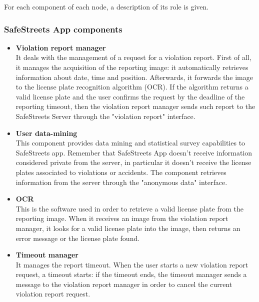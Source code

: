 \documentclass{article}
\begin{document}
		\clearpage
		For each component of each node, a description of its role is given.
		
		\subsubsection{SafeStreets App components}
		\begin{itemize}
			\item \textbf{Violation report manager}\\
			It deals with the management of a request for a violation report. First of all, it manages the acquisition of the reporting image: it automatically retrieves information about date, time and position. Afterwards, it forwards the image to the license plate recognition algorithm (OCR). If the algorithm returns a valid license plate and the user confirms the request by the deadline of the reporting timeout, then the violation report manager sends such report to the SafeStreets Server through the "violation report" interface.
			\item \textbf{User data-mining}\\
			This component provides data mining and statistical survey capabilities to SafeStreets app. Remember that SafeStreets App doesn't receive information considered private from the server, in particular it doesn't receive the license plates associated to violations or accidents. The component retrieves information from the server through the "anonymous data" interface.
			\item \textbf{OCR}\\
			This is the software used in order to retrieve a valid license plate from the reporting image. When it receives an image from the violation report manager, it looks for a valid license plate into the image, then returns an error message or the license plate found.
			\item \textbf{Timeout manager}\\
			It manages the report timeout. When the user starts a new violation report request, a timeout starts: if the timeout ends, the timeout manager sends a message to the violation report manager in order to cancel the current violation report request.
		\end{itemize}
\end{document}
